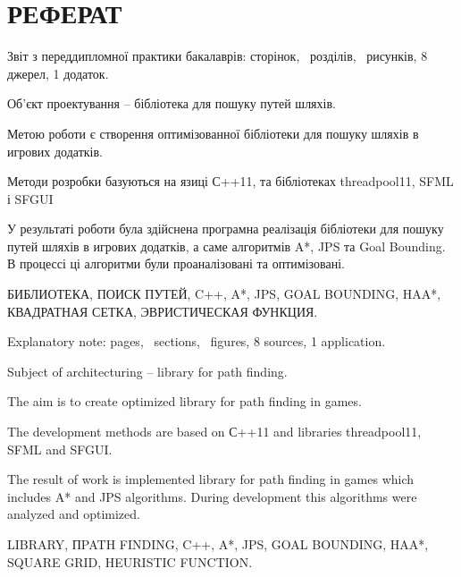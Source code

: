 \section*{РЕФЕРАТ}

\vspace{1\baselineskip}

\thispagestyle{empty}

Звіт з переддипломної практики бакалаврів: \pageref{LastPage} сторінок, \totalsections\ розділів,  \totalfigures\ рисунків, 8 джерел, 1 додаток.

Об'єкт проектування -- бібліотека для пошуку путей шляхів.

Метою роботи є створення оптимізованної бібліотеки для пошуку шляхів в игрових додатків.

Методи розробки базуються на язиці С++11, та бібліотеках threadpool11, SFML і SFGUI

У результаті роботи була здійснена програмна реалізація бібліотеки для пошуку путей шляхів в игрових додатків, а саме алгоритмів A*, JPS та Goal Bounding. В процессі ці алгоритми були проаналізовані та оптимізовані.

БИБЛИОТЕКА, ПОИСК ПУТЕЙ, C++, A*, JPS, GOAL BOUNDING, HAA*, КВАДРАТНАЯ СЕТКА, ЭВРИСТИЧЕСКАЯ ФУНКЦИЯ.

\vspace{1\baselineskip}

Explanatory note: \pageref{LastPage} pages, \totalsections\ sections,  \totalfigures\ figures, 8 sources, 1 application.

Subject of architecturing -- library for path finding.

The aim is to create optimized library for path finding in games.

The development methods are based on С++11 and libraries threadpool11, SFML and SFGUI.

The result of work is implemented library for path finding in games which includes A* and JPS algorithms. During development this algorithms were analyzed and optimized.

LIBRARY, ПPATH FINDING, C++, A*, JPS, GOAL BOUNDING, HAA*, SQUARE GRID, HEURISTIC FUNCTION.